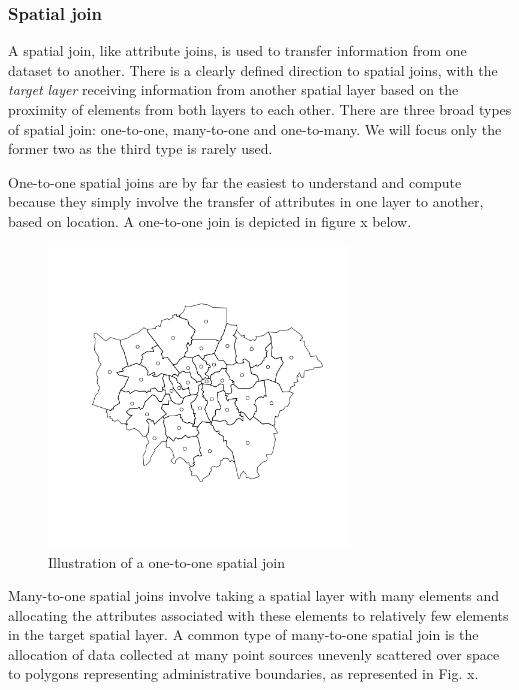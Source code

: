 \documentclass[]{article}
\let\Oldincludegraphics\includegraphics
\renewcommand{\includegraphics}[1]{\Oldincludegraphics[width=8cm]{#1}}
\begin{document}
\subsubsection{Spatial join}

A spatial join, like attribute joins, is used to transfer information
from one dataset to another. There is a clearly defined direction to
spatial joins, with the \emph{target layer} receiving information from
another spatial layer based on the proximity of elements from both
layers to each other. There are three broad types of spatial join:
one-to-one, many-to-one and one-to-many. We will focus only the former
two as the third type is rarely used.

One-to-one spatial joins are by far the easiest to understand and
compute because they simply involve the transfer of attributes in one
layer to another, based on location. A one-to-one join is depicted in
figure x below.

\begin{figure}[htbp]
\centering
\includegraphics{figure/Illustration_of_a_one-to-one_spatial_join_.png}
\caption{Illustration of a one-to-one spatial join}
\end{figure}

Many-to-one spatial joins involve taking a spatial layer with many
elements and allocating the attributes associated with these elements to
relatively few elements in the target spatial layer. A common type of
many-to-one spatial join is the allocation of data collected at many
point sources unevenly scattered over space to polygons representing
administrative boundaries, as represented in Fig. x.
\end{document}
